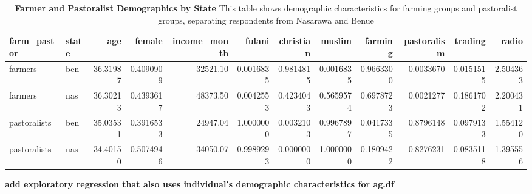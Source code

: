 \documentclass[
]{article}
\begin{document}
\begin{table}[H]
\begin{center}
\label{tab:demo_tab_state1}
\caption{\textbf{Farmer and Pastoralist Demographics by State} This table shows demographic characteristics for farming groups and pastoralist groups, separating respondents from Nasarawa and Benue}
\smallskip

\begin{tabular}{l|l|r|r|r|r|r|r|r|r|r|r}
\hline
farm\_pastor & state & age & female & income\_month & fulani & christian & muslim & farming & pastoralism & trading & radio\\
\hline
farmers & ben & 36.31987 & 0.4090909 & 32521.10 & 0.0016835 & 0.9814815 & 0.0016835 & 0.9663300 & 0.0033670 & 0.0151515 & 2.504363\\
\hline
farmers & nas & 36.30213 & 0.4393617 & 48373.50 & 0.0042553 & 0.4234043 & 0.5659574 & 0.6978723 & 0.0021277 & 0.1861702 & 2.200431\\
\hline
pastoralists & ben & 35.03531 & 0.3916533 & 24947.04 & 1.0000000 & 0.0032103 & 0.9967897 & 0.0417335 & 0.8796148 & 0.0979133 & 1.554120\\
\hline
pastoralists & nas & 34.40150 & 0.5074946 & 34050.07 & 0.9989293 & 0.0000000 & 1.0000000 & 0.1809422 & 0.8276231 & 0.0835118 & 1.395556\\
\hline
\end{tabular}


\end{center}
\end{table}

\textbf{add exploratory regression that also uses individual's
demographic characteristics for ag.df}
\end{document}
